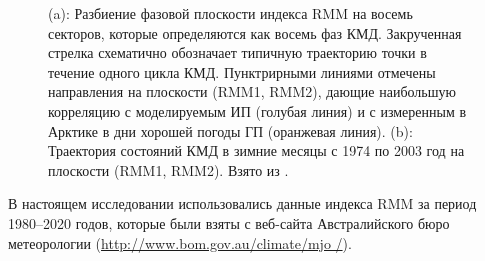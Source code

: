 \begin{figure}
\begin{subfigure}[tb]{.45\textwidth}
		\caption{}
		\label{fig:wh04_fig7}
	\end{subfigure}
    \caption{(a): Разбиение фазовой плоскости индекса RMM на восемь секторов, которые определяются как восемь фаз КМД. Закрученная стрелка схематично обозначает типичную траекторию точки в течение одного цикла КМД. Пунктрирными линиями отмечены направления на плоскости (RMM1, RMM2), дающие наибольшую корреляцию с моделируемым ИП (голубая линия) и с измеренным в Арктике в дни хорошей погоды ГП (оранжевая линия). (b): Траектория состояний КМД в зимние месяцы с 1974 по 2003 год на плоскости (RMM1, RMM2). Взято из \cite[рис. 7]{Wheeler_Hendon_2004}.}
    \label{fig:rmm_planes}
\end{figure}

В настоящем исследовании использовались данные индекса RMM за период 1980--2020 годов, которые были взяты с веб-сайта Австралийского бюро метеорологии (\url{http://www.bom.gov.au/climate/mjo /}).
